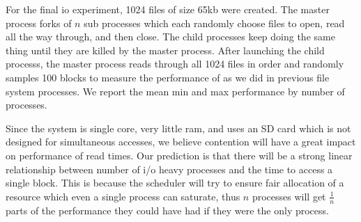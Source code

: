For the final io experiment, 1024 files of size 65kb were created.  
The master process forks of $n$ sub processes which each randomly choose files to open, read all the way through, and then close.
The child processes keep doing the same thing until they are killed by the master process.
After launching the child processs, the master process reads through all 1024 files in order and randomly samples 100 blocks to measure the performance of as we did in previous file system processes.
We report the mean min and max performance by number of processes.

Since the system is single core, very little ram, and uses an SD card which is not designed for simultaneous accesses, we believe contention will have a great impact on performance of read times.
Our prediction is that there will be a strong linear relationship between number of i/o heavy processes and the time to access a single block.  
This is because the scheduler will try to ensure fair allocation of a resource which even a single process can saturate, thus $n$ processes will get $\frac{1}{n}$ parts of the performance they could have had if they were the only process.

